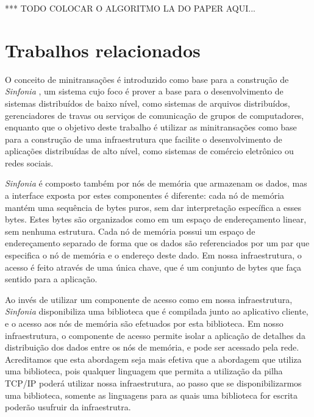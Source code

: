 \documentclass[11pt,twoside,a4paper]{book}
\begin{document}


*** TODO COLOCAR O ALGORITMO LA DO PAPER AQUI...

\section{Trabalhos relacionados}
\label{sec:trabalhos_relacionados}
O conceito de minitransações é introduzido como base para a construção de \emph{Sinfonia} \cite{sinfonia}, um sistema cujo foco é prover a base para o desenvolvimento de sistemas distribuídos de baixo nível, como sistemas de arquivos distribuídos, gerenciadores de travas ou serviços de comunicação de grupos de computadores, enquanto que o objetivo deste trabalho é utilizar as minitransações como base para a construção de uma infraestrutura que facilite o desenvolvimento de aplicações distribuídas de alto nível, como sistemas de comércio eletrônico ou redes sociais. 

\emph{Sinfonia} é composto também por nós de memória que armazenam os dados, mas a interface exposta por estes componentes é diferente: cada nó de memória mantém uma sequência de bytes puros, sem dar interpretação específica a esses bytes. Estes bytes são organizados como em um espaço de endereçamento linear, sem nenhuma estrutura. Cada nó de memória possui um espaço de endereçamento separado de forma que os dados são referenciados por um par que especifica o nó de memória e o endereço deste dado. Em nossa infraestrutura, o acesso é feito através de uma única chave, que é um conjunto de bytes que faça sentido para a aplicação.

Ao invés de utilizar um componente de acesso como em nossa infraestrutura, \emph{Sinfonia} disponibiliza uma biblioteca que é compilada junto ao aplicativo cliente, e o acesso aos nós de memória são efetuados por esta biblioteca. Em nosso infraestrutura, o componente de acesso permite isolar a aplicação de detalhes da distribuição dos dados entre os nós de memória, e pode ser acessado pela rede. Acreditamos que esta abordagem seja mais efetiva que a abordagem que utiliza uma biblioteca, pois qualquer linguagem que permita a utilização da pilha TCP/IP poderá utilizar nossa infraestrutura, ao passo que se disponibilizarmos uma biblioteca, somente as linguagens para as quais uma biblioteca for escrita poderão usufruir da infraestrutra.
\end{document}
